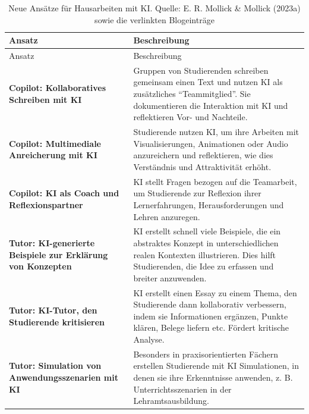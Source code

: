 \documentclass[
  ngerman,
  letterpaper,
  DIV=11]{scrreprt}
\begin{document}
\begin{longtable}[]{@{}
  >{\raggedright\arraybackslash}p{}
  >{\raggedright\arraybackslash}p{}@{}}
\caption{Neue Ansätze für Hausarbeiten mit KI. Quelle: E. R. Mollick \&
Mollick (2023a) sowie die verlinkten
Blogeinträge}\label{tbl-mollick-assignments}\tabularnewline
\toprule\noalign{}
\begin{minipage}[b]{\linewidth}\raggedright
Ansatz
\end{minipage} & \begin{minipage}[b]{\linewidth}\raggedright
Beschreibung
\end{minipage} \\
\midrule\noalign{}
\endfirsthead
\toprule\noalign{}
\begin{minipage}[b]{\linewidth}\raggedright
Ansatz
\end{minipage} & \begin{minipage}[b]{\linewidth}\raggedright
Beschreibung
\end{minipage} \\
\midrule\noalign{}
\endhead
\bottomrule\noalign{}
\endlastfoot
\textbf{Copilot: Kollaboratives Schreiben mit KI} & Gruppen von
Studierenden schreiben gemeinsam einen Text und nutzen KI als
zusätzliches ``Teammitglied''. Sie dokumentieren die Interaktion mit KI
und reflektieren Vor- und Nachteile. \\
\textbf{Copilot: Multimediale Anreicherung mit KI} & Studierende nutzen
KI, um ihre Arbeiten mit Visualisierungen, Animationen oder Audio
anzureichern und reflektieren, wie dies Verständnis und Attraktivität
erhöht. \\
\textbf{Copilot: KI als Coach und Reflexionspartner} & KI stellt Fragen
bezogen auf die Teamarbeit, um Studierende zur Reflexion ihrer
Lernerfahrungen, Herausforderungen und Lehren anzuregen. \\
\textbf{Tutor: KI-generierte Beispiele zur Erklärung von Konzepten} & KI
erstellt schnell viele Beispiele, die ein abstraktes Konzept in
unterschiedlichen realen Kontexten illustrieren. Dies hilft
Studierenden, die Idee zu erfassen und breiter anzuwenden. \\
\textbf{Tutor: KI-Tutor, den Studierende kritisieren} & KI erstellt
einen Essay zu einem Thema, den Studierende dann kollaborativ
verbessern, indem sie Informationen ergänzen, Punkte klären, Belege
liefern etc. Fördert kritische Analyse. \\
\textbf{Tutor: Simulation von Anwendungsszenarien mit KI} & Besonders in
praxisorientierten Fächern erstellen Studierende mit KI Simulationen, in
denen sie ihre Erkenntnisse anwenden, z. B. Unterrichtsszenarien in der
Lehramtsausbildung. \\
\end{longtable}
\end{document}
